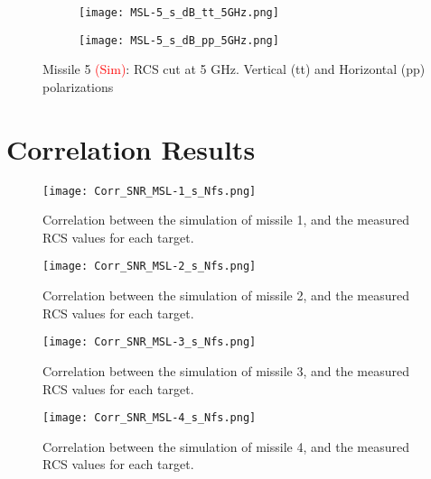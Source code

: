   \begin{figure}[htbp]
    \centering
    \begin{subfigure}{.5\textwidth}
      \centering
      \texttt{[image: MSL-5\_s\_dB\_tt\_5GHz.png]}
    \end{subfigure}%
    \begin{subfigure}{.5\textwidth}
      \centering
      \texttt{[image: MSL-5\_s\_dB\_pp\_5GHz.png]}
    \end{subfigure}
    \caption{Missile 5 \textcolor{red}{(Sim)}:  RCS cut at 5 GHz. Vertical (tt) and Horizontal (pp) polarizations }
    \label{fig:ns5}
  \end{figure}

\chapter{Correlation Results}
\label{app:correlation_results}
  \begin{figure}[htbp!]
    \centering
    \texttt{[image: Corr\_SNR\_MSL-1\_s\_Nfs.png]}
    \caption[Missile 1 Correlations (Sim/Meas)]{Correlation between the simulation of missile 1, and the measured RCS values for each target.}
    \label{fig:corr_msl1}
  \end{figure}

  \begin{figure}[htbp!]
    \centering
    \texttt{[image: Corr\_SNR\_MSL-2\_s\_Nfs.png]}
    \caption[Missile 1 Correlations (Sim/Meas)]{Correlation between the simulation of missile 2, and the measured RCS values for each target.}
    \label{fig:corr_msl2}
  \end{figure}

  \begin{figure}[htbp!]
    \centering
    \texttt{[image: Corr\_SNR\_MSL-3\_s\_Nfs.png]}
    \caption[Missile 1 Correlations (Sim/Meas)]{Correlation between the simulation of missile 3, and the measured RCS values for each target.}
    \label{fig:corr_msl3}
  \end{figure}

  \begin{figure}[htbp!]
    \centering
    \texttt{[image: Corr\_SNR\_MSL-4\_s\_Nfs.png]}
    \caption[Missile 1 Correlations (Sim/Meas)]{Correlation between the simulation of missile 4, and the measured RCS values for each target.}
    \label{fig:corr_msl4}
  \end{figure}

